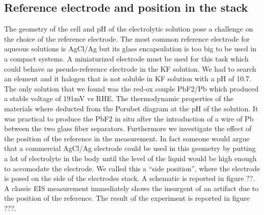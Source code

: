 \subsection{Reference electrode and position in the stack}


The geometry of the cell and pH of the electrolytic solution pose a challenge on the choice of the reference electrode. The most common reference electrode for aqueous solutions is AgCl/Ag but its glass encapsulation is too big to be used in a compact systems. A miniaturized electrode must be used for this task which could behave as pseudo-reference electrode in the KF solution. We had to search an element and it halogen that is not soluble in KF solution with a pH of 10.7. The only solution that we found was the red-ox couple PbF2/Pb which produced a stable voltage of 191mV vs RHE. The thermodynamic properties of the materials where deducted from the Porubet diagram at the pH of the solution. It was practical to produce the PbF2 in situ after the introduction of a wire of Pb between the two glass fiber separators. Furthermore we investigate the effect of the position of the reference in the measurement. In fact someone would argue that a commercial AgCl/Ag electrode could be used in this geometry by putting a lot of electrolyte in the body until the level of the liquid would be high enough to accomodate the electrode. We called this a “side position”, where the electrode is posed on the side of the electrodes stack. A schematic is reported in figure ??. A classic EIS measurement immediately shows the insurgent of an artifact due to the position of the reference. The result of the experiment is reported in figure ???.

